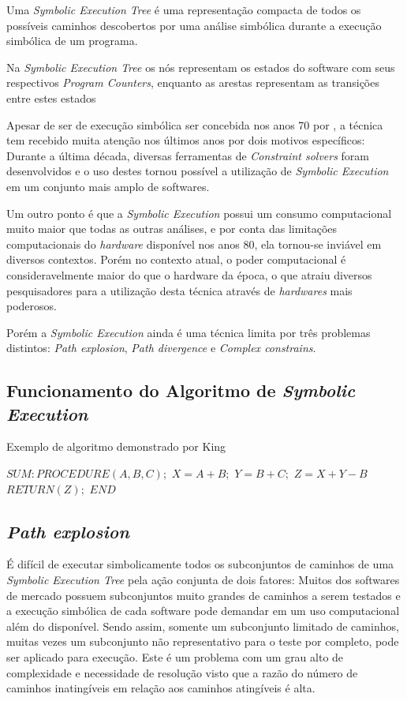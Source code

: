 \documentclass[
	12pt,				%
	oneside,			%
	a4paper,			%
	english,			%
	brazil				%
	]{abntex2ppgsi}
\begin{document}
Uma \textit{Symbolic Execution Tree} é uma representação compacta de todos os possíveis caminhos descobertos por uma análise simbólica durante a execução simbólica de um programa.

Na \textit{Symbolic Execution Tree} os nós representam os estados do software com seus respectivos \textit{Program Counters}, enquanto as arestas representam as transições entre estes estados

Apesar de ser de execução simbólica ser concebida nos anos 70 por \cite{King1976}, a técnica tem recebido muita atenção nos últimos anos por dois motivos específicos: 
Durante a última década, diversas ferramentas de \textit{Constraint solvers} foram desenvolvidos e o uso destes tornou possível a utilização de  \textit{Symbolic Execution} em um conjunto mais amplo de softwares.

Um outro ponto é que a \textit{Symbolic Execution} possui um consumo computacional muito maior que todas as outras análises, e por conta das limitações computacionais do \textit{hardware} disponível nos anos 80, ela tornou-se inviável em diversos contextos. Porém no contexto atual, o poder computacional é consideravelmente maior do que o hardware da época, o que atraiu diversos pesquisadores para a utilização desta técnica através de \textit{hardwares} mais poderosos.

Porém a \textit{Symbolic Execution} ainda é uma técnica limita por três problemas distintos: \textit{Path explosion}, \textit{Path divergence} e \textit{Complex constrains}. 

\subsection{Funcionamento do Algoritmo de \textit{Symbolic Execution}}

\begin{algorithm}[htbp]
\caption{Exemplo de algoritmo demonstrado por King}
\label{alg:algoritmo-exemplo1}
\begin{algorithmic}[1]
\State $SUM: PROCEDURE (A,B,C); $
\State $	X = A + B; $
\State $	Y = B + C; $
\State $	Z = X + Y - B$
\State $	RETURN(Z);$
\State $END$
\EndProcedure
\end{algorithmic}
\end{algorithm}

\subsection{\textit{Path explosion}}
É difícil de executar simbolicamente todos os subconjuntos de caminhos de uma \textit{Symbolic Execution Tree} pela ação conjunta de dois fatores: Muitos dos softwares de mercado possuem subconjuntos muito grandes de caminhos a serem testados e a execução simbólica de cada software pode demandar em um uso computacional além do disponível. Sendo assim, somente um subconjunto limitado de caminhos, muitas vezes um subconjunto não representativo para o teste por completo, pode ser aplicado para execução.
Este é um problema com um grau alto de complexidade e necessidade de resolução visto que a razão do número de caminhos inatingíveis em relação aos caminhos atingíveis é alta. 
\end{document}
